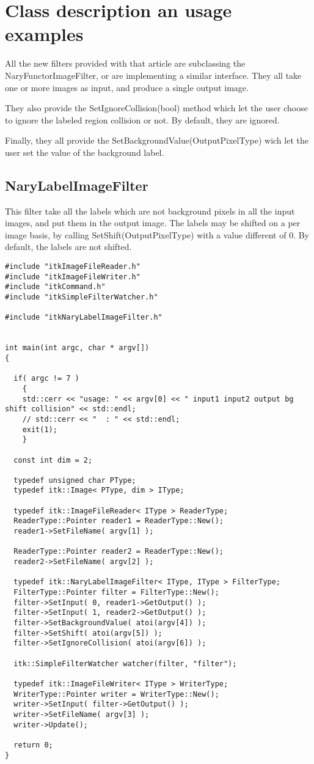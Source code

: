 \documentclass{InsightArticle}
\begin{document}
\section{Class description an usage examples}

All the new filters provided with that article are subclassing the NaryFunctorImageFilter, or
are implementing a similar interface. They all take one or more images as input, and produce a
single output image.

They also provide the SetIgnoreCollision(bool) method which let the user choose to ignore the
labeled region collision or not. By default, they are ignored.

Finally, they all provide the SetBackgroundValue(OutputPixelType) wich let the user set the
value of the background label.

\subsection{NaryLabelImageFilter}

This filter take all the labels which are not background pixels in all the input images, and
put them in the output image. The labels may be shifted on a per image basis, by calling
SetShift(OutputPixelType) with a value different of 0. By default, the labels are not shifted.

\small \begin{verbatim}
#include "itkImageFileReader.h"
#include "itkImageFileWriter.h"
#include "itkCommand.h"
#include "itkSimpleFilterWatcher.h"

#include "itkNaryLabelImageFilter.h"


int main(int argc, char * argv[])
{

  if( argc != 7 )
    {
    std::cerr << "usage: " << argv[0] << " input1 input2 output bg shift collision" << std::endl;
    // std::cerr << "  : " << std::endl;
    exit(1);
    }

  const int dim = 2;
  
  typedef unsigned char PType;
  typedef itk::Image< PType, dim > IType;

  typedef itk::ImageFileReader< IType > ReaderType;
  ReaderType::Pointer reader1 = ReaderType::New();
  reader1->SetFileName( argv[1] );

  ReaderType::Pointer reader2 = ReaderType::New();
  reader2->SetFileName( argv[2] );

  typedef itk::NaryLabelImageFilter< IType, IType > FilterType;
  FilterType::Pointer filter = FilterType::New();
  filter->SetInput( 0, reader1->GetOutput() );
  filter->SetInput( 1, reader2->GetOutput() );
  filter->SetBackgroundValue( atoi(argv[4]) );
  filter->SetShift( atoi(argv[5]) );
  filter->SetIgnoreCollision( atoi(argv[6]) );

  itk::SimpleFilterWatcher watcher(filter, "filter");

  typedef itk::ImageFileWriter< IType > WriterType;
  WriterType::Pointer writer = WriterType::New();
  writer->SetInput( filter->GetOutput() );
  writer->SetFileName( argv[3] );
  writer->Update();

  return 0;
}
\end{verbatim} \normalsize
\end{document}
